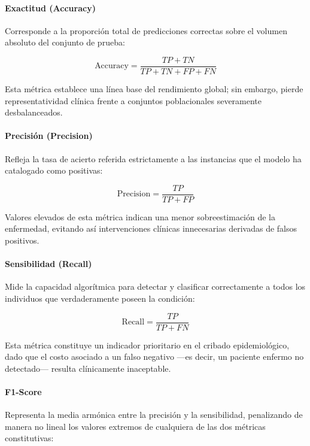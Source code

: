 \documentclass[journal]{IEEEtran}
\begin{document}
\paragraph{Exactitud (Accuracy)}
Corresponde a la proporción total de predicciones correctas sobre el volumen absoluto del conjunto de prueba:

\begin{equation}
\text{Accuracy} = \frac{TP + TN}{TP + TN + FP + FN}
\end{equation}

Esta métrica establece una línea base del rendimiento global; sin embargo, pierde representatividad clínica frente a conjuntos poblacionales severamente desbalanceados.

\paragraph{Precisión (Precision)}
Refleja la tasa de acierto referida estrictamente a las instancias que el modelo ha catalogado como positivas:

\begin{equation}
\text{Precision} = \frac{TP}{TP + FP}
\end{equation}

Valores elevados de esta métrica indican una menor sobreestimación de la enfermedad, evitando así intervenciones clínicas innecesarias derivadas de falsos positivos.

\paragraph{Sensibilidad (Recall)}
Mide la capacidad algorítmica para detectar y clasificar correctamente a todos los individuos que verdaderamente poseen la condición:

\begin{equation}
\text{Recall} = \frac{TP}{TP + FN}
\end{equation}

Esta métrica constituye un indicador prioritario en el cribado epidemiológico, dado que el costo asociado a un falso negativo —es decir, un paciente enfermo no detectado— resulta clínicamente inaceptable.

\paragraph{F1-Score}
Representa la media armónica entre la precisión y la sensibilidad, penalizando de manera no lineal los valores extremos de cualquiera de las dos métricas constitutivas:
\end{document}
